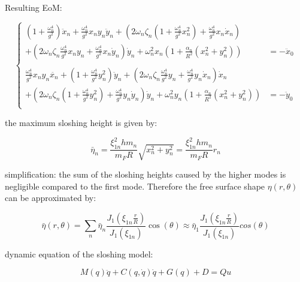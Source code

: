 \documentclass{ltxdockit}
\begin{document}
Resulting EoM: 

\begin{equation}
\begin{cases}

(1 + \frac{\omega_n^4}{g^2}) \ddot x_n + \frac{\omega_n^4}{g^2} x_n y_n \ddot y_n + (2 \omega_n \zeta_n (1 + \frac{\omega_n^4}{g^2} x_n^2) + \frac{\omega_n^4}{g^2} x_n \dot x_n) \\ 
+ (2 \omega_n \zeta_n \frac{\omega_n^4}{g^2} x_n y_n + \frac{\omega_n^4}{g^2} x_n \dot y_n) \dot y_n + \omega_n^2 x_n (1+ \frac{\alpha_n}{R^2}(x_n^2 + y_n^2)) &= - \ddot x_0 
\\
\\
\frac{\omega_n^4}{g^2} x_n y_n \ddot{x_n} + (1 + \frac{\omega_n^4}{g^2} y_n^2) \ddot y_n + (2 \omega_n \zeta_n \frac{\omega_n^4}{g^2} y_n + \frac{\omega_n^4}{g^2} y_n \dot x_n) \dot x_n \\
+ (2 \omega_n \zeta_n(1+ \frac{\omega_n^4}{g^2} y_n^2) + \frac{\omega_n^4}{g^2} y_n \dot y_n) \dot y_n + \omega_n^2 y_n (1 + \frac{\alpha_n}{R^2}(x_n^2 + y_n^2)) &= - \ddot y_0 \\

\end{cases}
\end{equation}

the maximum sloshing height is given by:

\begin{equation}
\bar \eta_n = \frac{\xi_{1n}^2 h m_n}{m_F R} \sqrt{x_n^2 + y_n^2} = \frac{\xi_{1n}^2 h m_n}{m_F R}r_n
\end{equation}

simplification: the sum of the sloshing heights caused by the higher modes is negligible compared to the first mode. Therefore the free surface shape \(\eta(r,\theta)\) can be approximated by:

\begin{equation}
\bar \eta(r,\theta) = \sum_{n}^{} \bar \eta_n \frac{J_1(\xi_{1n}\frac{r}{R})}{J_1(\xi_{1n})} \cos(\theta) \approx \bar \eta_1 \frac{J_1(\xi_{1n}\frac{r}{R})}{J_1(\xi_{1n})}cos(\theta)
\end{equation}

dynamic equation of the sloshing model:

\begin{equation}
M(q) \ddot q + C(q, \dot q) \dot q + G(q) + D = Q u
\end{equation}
\end{document}

